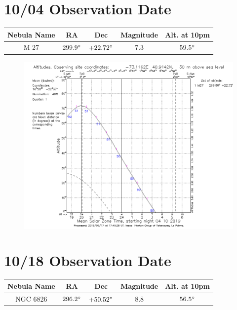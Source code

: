 \documentclass{article}[12pt]
\begin{document}
	
\section{10/04 Observation Date}
	
\begin{table}[h]
	\begin{center}
	\begin{tabular}{|c | c | c | c | c |}
		\hline
		Nebula Name & RA & Dec & Magnitude & Alt. at 10pm \\
		\hline
		\hline
		M 27 & $299.9\degree$ & $+22.72\degree$ & 7.3 & $59.5\degree$\\
		\hline
	\end{tabular}
	\end{center}
\end{table}

\begin{figure}[h]
	\includegraphics[width=\linewidth]{M27_10_04.pdf}
\end{figure}

\newpage

\section{10/18 Observation Date}

\begin{table}[h]
	\begin{center}
		\begin{tabular}{|c | c | c | c | c |}
			\hline
			Nebula Name & RA & Dec & Magnitude & Alt. at 10pm \\
			\hline
			\hline
			NGC 6826 & $296.2\degree$ & $+50.52\degree$ & 8.8 & $56.5\degree$\\
			\hline
		\end{tabular}
	\end{center}
\end{table}
\end{document}
